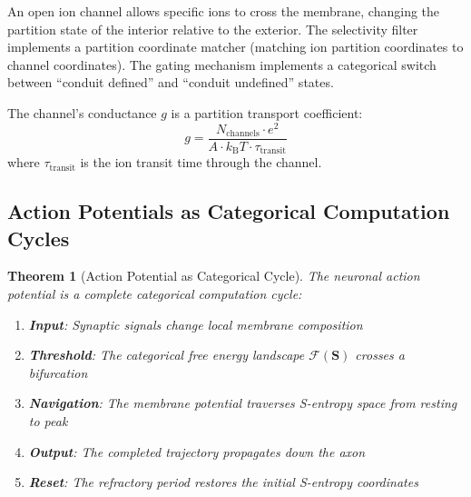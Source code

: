 \documentclass[twocolumn,10pt]{article}
\newtheorem{theorem}{Theorem}[section]
\theoremstyle{remark}
\newcommand{\kB}{k_{\mathrm{B}}}
\newcommand{\Scoord}{\mathbf{S}}
\begin{document}
An open ion channel allows specific ions to cross the membrane, changing the partition state of the interior relative to the exterior. The selectivity filter implements a partition coordinate matcher (matching ion partition coordinates to channel coordinates). The gating mechanism implements a categorical switch between ``conduit defined'' and ``conduit undefined'' states.

The channel's conductance $g$ is a partition transport coefficient:
\begin{equation}
    g = \frac{N_{\text{channels}} \cdot e^2}{A \cdot \kB T \cdot \tau_{\text{transit}}}
\end{equation}
where $\tau_{\text{transit}}$ is the ion transit time through the channel.

\subsection{Action Potentials as Categorical Computation Cycles}

\begin{theorem}[Action Potential as Categorical Cycle]
\label{thm:action_potential}
The neuronal action potential is a complete categorical computation cycle:
\begin{enumerate}
    \item \textbf{Input}: Synaptic signals change local membrane composition
    \item \textbf{Threshold}: The categorical free energy landscape $\mathcal{F}(\Scoord)$ crosses a bifurcation
    \item \textbf{Navigation}: The membrane potential traverses S-entropy space from resting to peak
    \item \textbf{Output}: The completed trajectory propagates down the axon
    \item \textbf{Reset}: The refractory period restores the initial S-entropy coordinates
\end{enumerate}
\end{theorem}
\end{document}
